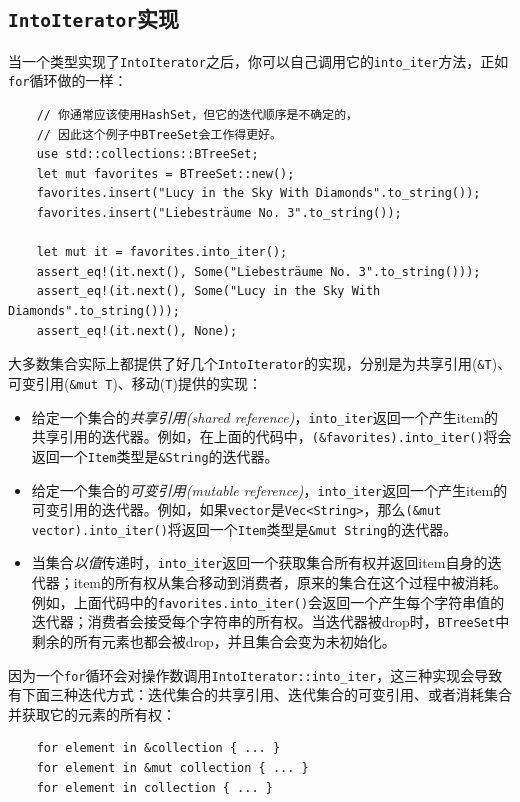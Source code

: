 \subsection{\texttt{IntoIterator}实现}\label{IntoIter}
当一个类型实现了\texttt{IntoIterator}之后，你可以自己调用它的\texttt{into\_iter}方法，正如\texttt{for}循环做的一样：
\begin{verbatim}
    // 你通常应该使用HashSet，但它的迭代顺序是不确定的，
    // 因此这个例子中BTreeSet会工作得更好。
    use std::collections::BTreeSet;
    let mut favorites = BTreeSet::new();
    favorites.insert("Lucy in the Sky With Diamonds".to_string());
    favorites.insert("Liebesträume No. 3".to_string());

    let mut it = favorites.into_iter();
    assert_eq!(it.next(), Some("Liebesträume No. 3".to_string()));
    assert_eq!(it.next(), Some("Lucy in the Sky With Diamonds".to_string()));
    assert_eq!(it.next(), None);
\end{verbatim}

大多数集合实际上都提供了好几个\texttt{IntoIterator}的实现，分别是为共享引用(\texttt{\&T})、可变引用(\texttt{\&mut T})、移动(\texttt{T})提供的实现：
\begin{itemize}
    \item 给定一个集合的\emph{共享引用(shared reference)}，\texttt{into\_iter}返回一个产生item的共享引用的迭代器。例如，在上面的代码中，\texttt{(\&favorites).into\_iter()}将会返回一个\texttt{Item}类型是\texttt{\&String}的迭代器。
    \item 给定一个集合的\emph{可变引用(mutable reference)}，\texttt{into\_iter}返回一个产生item的可变引用的迭代器。例如，如果\texttt{vector}是\texttt{Vec<String>}，那么\texttt{(\&mut vector).into\_iter()}将返回一个\texttt{Item}类型是\texttt{\&mut String}的迭代器。
    \item 当集合\emph{以值}传递时，\texttt{into\_iter}返回一个获取集合所有权并返回item自身的迭代器；item的所有权从集合移动到消费者，原来的集合在这个过程中被消耗。例如，上面代码中的\texttt{favorites.into\_iter()}会返回一个产生每个字符串值的迭代器；消费者会接受每个字符串的所有权。当迭代器被drop时，\texttt{BTreeSet}中剩余的所有元素也都会被drop，并且集合会变为未初始化。
\end{itemize}

因为一个\texttt{for}循环会对操作数调用\texttt{IntoIterator::into\_iter}，这三种实现会导致有下面三种迭代方式：迭代集合的共享引用、迭代集合的可变引用、或者消耗集合并获取它的元素的所有权：
\begin{verbatim}
    for element in &collection { ... }
    for element in &mut collection { ... }
    for element in collection { ... }
\end{verbatim}

